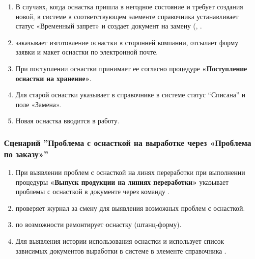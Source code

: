 \begin{enumerate}
\item	В случаях, когда оснастка пришла в негодное состояние и требует создания новой, \preproductionspecialist в системе \gofro в соответствующем элементе справочника  устанавливает статус «Временный запрет» и создает документ на замену (,  .
\item	\tehnolog заказывает изготовление оснастки в сторонней компании, отсылает форму заявки и макет оснастки по электронной почте.
\item	При поступлении оснастки \preproductionspecialist принимает ее согласно процедуре \textbf{«Поступление оснастки на хранение»}.
\item	Для старой оснастки \preproductionspecialist указывает в справочнике  в системе \gofro статус “Списана” и поле «Замена».
\item	Новая оснастка вводится в работу. %






\end{enumerate}



\subsubsection{Сценарий ''Проблема с оснасткой на выработке через «Проблема по заказу»''}
\label{bp:tool_4}

\begin{enumerate}
\item	При выявлении проблем с оснасткой на линях переработки при выполнении процедуры \textbf{«Выпуск продукции на линиях переработки»} \operator указывает проблемы с оснасткой в документе  через команду .
\item	\preproductionspecialist проверяет журнал  за смену для выявления возможных проблем с оснасткой.

\item \operator по возможности ремонтирует оснастку (штанц-форму). 
\item	Для выявления истории использования оснастки \tehnolog и \preproductionspecialist использует список зависимых  документов выработки в системе \gofro в элементе  справочника .
\end{enumerate}